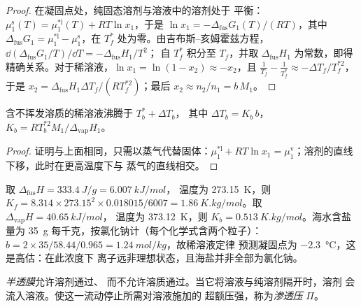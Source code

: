 \begin{proof}
在凝固点处，纯固态溶剂与溶液中的溶剂处于
平衡：$\mu_1^{\text{s}}(T) = \mu_1^{*\text{l}}(T) + RT\ln x_1$，于是
$\ln x_1 = -\Delta_{\text{fus}}G_1(T)/(RT)$，其中 $\Delta_{\text{fus}}G_1 =
\mu_1^{*\text{l}} - \mu_1^{\text{s}}$，在 $T_f^*$ 处为零。由吉布斯–亥姆霍兹方程，
$\dd(\Delta_{\text{fus}}G_1/T)/\dd T = -\Delta_{\text{fus}}H_1/T^2$；
自 $T_f^*$ 积分至 $T_f$，并取 $\Delta_{\text{fus}}H_1$ 为常数，即得
精确关系。对于稀溶液，$\ln x_1 = \ln(1 - x_2) \approx
-x_2$，且 $\frac1{T_f} - \frac1{T_f^*} \approx -\Delta T_f/T_f^{*2}$，于是
$x_2 = \Delta_{\text{fus}}H_1\Delta T_f/(RT_f^{*2})$；最后 $x_2 \approx
n_2/n_1 = b\,M_1$。
\end{proof}

\begin{proposition}[沸点升高]\label{prop:b2:chemical-potential:ebullioscopy}
含不挥发溶质的稀溶液沸腾于 $T_b^* + \Delta T_b$，
其中 $\Delta T_b = K_b\,b$，$K_b = RT_b^{*2}M_1/\Delta_{\text{vap}}H_1$。
\end{proposition}

\begin{proof}
证明与上面相同，只需以蒸气代替固体：$\mu_1^{*\text{l}} +
RT\ln x_1 = \mu_1^{\text{v}}$；溶剂的直线下移，此时在更高温度下与
蒸气的直线相交。
\end{proof}

\begin{example}[水]\label{ex:b2:chemical-potential:water-constants}
取 $\Delta_{\text{fus}}H = \qty{333.4}{J/g} = \qty{6.007}{kJ/mol}$，
温度为 \qty{273.15}{K}，则 $K_f = 8.314 \times 273.15^2 \times 0.018015/6007 =
\qty{1.86}{K.kg/mol}$。取 $\Delta_{\text{vap}}H = \qty{40.65}{kJ/mol}$，
温度为 \qty{373.12}{K}，则 $K_b = \qty{0.513}{K.kg/mol}$。海水含盐量为 \qty{35}{g}
每千克，按氯化钠计（每个化学式含两个粒子）：
$b = 2 \times 35/58.44/0.965 = \qty{1.24}{mol/kg}$，故稀溶液定律
预测凝固点为 \qty{-2.3}{\celsius}，这是高估：在此浓度下
离子远非理想状态，且海盐并非全部为氯化钠。
\end{example}

\begin{definition}[半透膜与渗透压]\label{def:b2:chemical-potential:osmotic-pressure}
\emph{半透膜}允许溶剂通过、
而不允许溶质通过。当它将溶液与纯溶剂隔开时，溶剂
会流入溶液。使这一流动停止所需对溶液施加的
超额压强，称为\emph{渗透压}
$\Pi$。
\end{definition}

